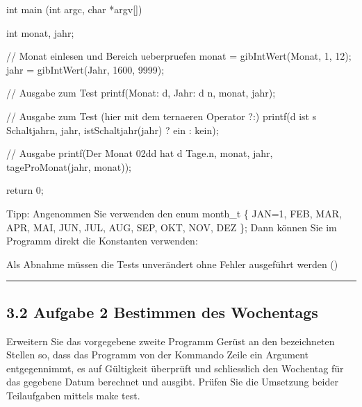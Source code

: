 \documentclass[a4paper,10pt,english]{report}
\begin{document}
\begin{sphinxVerbatim}[commandchars=\\\{\}]
int main (int argc, char *argv[]) \PYGZob{}
    
    int monat, jahr;
     
    //  Monat einlesen und Bereich ueberpruefen
    monat = gibIntWert(\PYGZdq{}Monat\PYGZdq{}, 1, 12);
    jahr  = gibIntWert(\PYGZdq{}Jahr\PYGZdq{}, 1600, 9999);
	
    //  Ausgabe zum Test
    printf(\PYGZdq{}Monat: \PYGZpc{}d, Jahr: \PYGZpc{}d \PYGZbs{}n\PYGZdq{}, monat, jahr);    
    
    //  Ausgabe zum Test (hier mit dem ternaeren Operator \PYGZdq{}?:\PYGZdq{})
    printf(\PYGZdq{}\PYGZpc{}d ist \PYGZpc{}s Schaltjahr\PYGZbs{}n\PYGZdq{}, jahr, istSchaltjahr(jahr) ? \PYGZdq{}ein\PYGZdq{} : \PYGZdq{}kein\PYGZdq{});

	// Ausgabe
	printf(\PYGZdq{}Der Monat \PYGZpc{}02d\PYGZhy{}\PYGZpc{}d hat \PYGZpc{}d Tage.\PYGZbs{}n\PYGZdq{}, monat, jahr, tageProMonat(jahr, monat));
   
    return 0;
\PYGZcb{}
\end{sphinxVerbatim}

\sphinxAtStartPar
Tipp: Angenommen Sie verwenden den enum month\_t \{ JAN=1, FEB, MAR, APR, MAI, JUN, JUL, AUG, SEP, OKT, NOV, DEZ \};
Dann können Sie im Programm direkt die Konstanten verwenden:

\begin{sphinxVerbatim}[commandchars=\\\{\}]
    		  
    	   
    	   
\end{sphinxVerbatim}

\sphinxAtStartPar
Als Abnahme müssen die Tests unverändert ohne Fehler ausgeführt werden ()


\bigskip\hrule\bigskip



\subsection{3.2 Aufgabe 2 Bestimmen des Wochentags}
\label{\detokenize{P02_Funktionen_Datentyp_enum/README:aufgabe-2-bestimmen-des-wochentags}}
\sphinxAtStartPar
Erweitern Sie das vorgegebene zweite Programm Gerüst an den bezeichneten Stellen so, dass das Programm von der Kommando Zeile ein Argument entgegennimmt, es auf Gültigkeit überprüft und schliesslich den Wochentag für das gegebene Datum berechnet und ausgibt.
Prüfen Sie die Umsetzung beider Teilaufgaben mittels make test.
\end{document}
